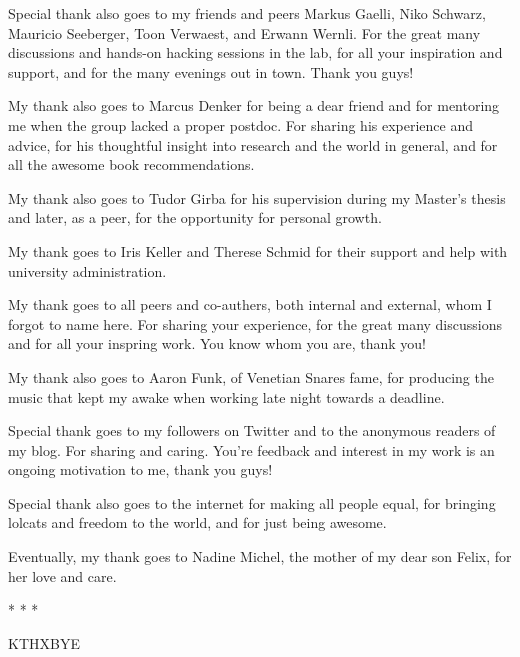 Special thank also goes to my friends and peers Markus Gaelli, Niko Schwarz, Mauricio Seeberger, Toon Verwaest, and Erwann Wernli. For the great many discussions and hands-on hacking sessions in the lab, for all your inspiration and support, and for the many evenings out in town.  Thank you guys!

My thank also goes to Marcus Denker for being a dear friend and for mentoring me when the group lacked a proper postdoc. For sharing his experience and advice, for his thoughtful insight into research and the world in general, and for all the awesome book recommendations. 

My thank also goes to Tudor Girba for his supervision during my Master's thesis and later, as a peer, for the opportunity for personal growth.

My thank goes to Iris Keller and Therese Schmid for their support and help with university administration.

My thank goes to all peers and co-authers, both internal and external, whom I forgot to name here. For sharing your experience, for the great many discussions and for all your inspring work. You know whom you are, thank you!

My thank also goes to Aaron Funk, of Venetian Snares fame, for producing the music that kept my awake when working late night towards a deadline. 

Special thank goes to my followers on Twitter and to the anonymous readers of my blog. For sharing and caring. You're feedback and interest in my work is an ongoing motivation to me, thank you guys!

Special thank also goes to the internet for making all people equal, for bringing lolcats and freedom to the world, and for just being awesome.

Eventually, my thank goes to Nadine Michel, the mother of my dear son Felix, for her love and care. 

\begin{center}* * *\end{center}

KTHXBYE